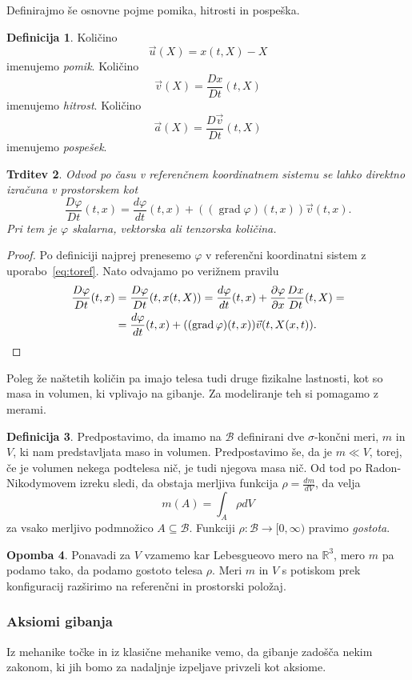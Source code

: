 \documentclass[12pt,a4paper,twoside]{article}
\theoremstyle{definition} %
\newtheorem{definicija}{Definicija}[section]
\newtheorem{opomba}[definicija]{Opomba}
\theoremstyle{plain} %
\newtheorem{trditev}[definicija]{Trditev}
\numberwithin{equation}{section}
\newcommand{\R}{\mathbb R}
\newcommand{\B}{\mathcal{B}}
\newcommand{\grad}{\operatorname{grad}}
\renewcommand{\phi}{\varphi}
\newcommand{\dpar}[2]{\ensuremath{\frac{\partial #1}{\partial #2}}}
\newcommand{\dd}[2]{\ensuremath{\frac{d #1}{d #2}}}
\newcommand{\ddt}[1]{\dd{#1}{t}}
\newcommand{\DD}[2]{\ensuremath{\frac{D #1}{D #2}}}
\newcommand{\DDt}[1]{\DD{#1}{t}}
\newcommand{\vv}{\vec{v}}
\newcommand{\vu}{\vec{u}}
\newcommand{\va}{\vec{a}}
\newcommand{\vX}{X}
\newcommand{\vx}{x}
\begin{document}
Definirajmo še osnovne pojme pomika, hitrosti in pospeška.
\begin{definicija}
  Količino \[ \vu(\vX) = \vx(t, \vX) - \vX \] imenujemo \emph{pomik}.
  Količino \[ \vv(\vX) = \DDt{\vx}(t, \vX) \] imenujemo \emph{hitrost}.
  Količino \[ \va(\vX) = \DDt{\vv}(t, \vX) \] imenujemo \emph{pospešek}.
\end{definicija}
\begin{trditev}
  Odvod po času v referenčnem koordinatnem sistemu se lahko direktno izračuna v
  prostorskem kot
  \[
  \DDt{\phi}(t, \vx) = \ddt{\phi}(t, \vx) + ((\grad \phi)(t, \vx)) \vv(t, \vx).
  \]
  Pri tem je $\phi$ skalarna, vektorska ali tenzorska količina.
\end{trditev}
\begin{proof}
  Po definiciji najprej prenesemo $\phi$ v referenčni koordinatni sistem z
  uporabo~\ref{eq:toref}. Nato odvajamo po verižnem pravilu
  \begin{align*}
    \DDt \phi(t, \vx) &= \DDt \phi(t, \vx(t, \vX)) =
    \ddt \phi(t, \vx) + \dpar{\phi}{\vx} \DDt{\vx} (t, \vX) = \\
    &= \ddt \phi(t, \vx) + ((\grad \phi)(t, \vx)) \vv(t, \vX(\vx, t)). \qedhere
  \end{align*}
\end{proof}

Poleg že naštetih količin pa imajo telesa tudi druge fizikalne lastnosti, kot so
masa in volumen, ki vplivajo na gibanje. Za modeliranje teh si pomagamo z
merami.

\begin{definicija}
  Predpostavimo, da imamo na $\B$ definirani dve $\sigma$-končni meri, $m$ in
  $V$, ki nam predstavljata maso in volumen. Predpostavimo še, da je $m \ll V$,
  torej, če je volumen nekega podtelesa nič, je tudi njegova masa nič. Od tod po
  Radon-Nikodymovem izreku sledi, da obstaja merljiva funkcija $\rho =
  \dd{m}{V}$, da velja
  \[
    m(A) = \int_{A} \rho dV
  \]
  za vsako merljivo podmnožico $A \subseteq \B$.
  Funkciji $\rho\colon\B\to[0, \infty)$ pravimo \emph{gostota}.
\end{definicija}
\begin{opomba}
  Ponavadi za $V$ vzamemo kar Lebesgueovo mero na $\R^3$, mero $m$ pa podamo tako, da
  podamo gostoto telesa $\rho$. Meri $m$ in $V$ s potiskom prek konfiguracij
  razširimo na referenčni in prostorski položaj.
\end{opomba}

\subsubsection{Aksiomi gibanja}
Iz mehanike točke in iz klasične mehanike vemo, da gibanje zadošča nekim
zakonom, ki jih bomo za nadaljnje izpeljave privzeli kot aksiome.
\end{document}
